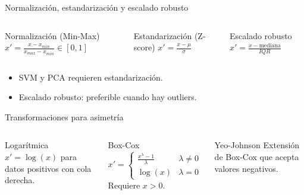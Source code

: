 \documentclass[aspectratio=169, 10pt, xcolor=table]{beamer}
\begin{document}
\begin{frame}{Normalización, estandarización y escalado robusto}
    \begin{columns}[t]
        \begin{block}{Normalización (Min-Max)}
            $x' = \frac{x - x_{min}}{x_{max} - x_{min}} \in [0,1]$
        \end{block}
        \begin{block}{Estandarización (Z-score)}
            $x' = \frac{x - \mu}{\sigma}$
        \end{block}
        \begin{block}{Escalado robusto}
            $x' = \frac{x - \text{mediana}}{IQR}$
        \end{block}
    \end{columns}
    \vspace{0.2cm}
    \begin{itemize}
        \item SVM y PCA requieren estandarización.
        \item Escalado robusto: preferible cuando hay outliers.
    \end{itemize}
\end{frame}

\begin{frame}{Transformaciones para asimetría}
    \begin{columns}[t]
        \begin{block}{Logarítmica}
            $x' = \log(x)$ para datos positivos con cola derecha.
        \end{block}
        \begin{block}{Box-Cox}
            \[
            x' = \begin{cases}
                \frac{x^\lambda - 1}{\lambda} & \lambda \neq 0 \\
                \log(x) & \lambda = 0
            \end{cases}
            \]
            Requiere $x>0$.
        \end{block}
        \begin{block}{Yeo-Johnson}
            Extensión de Box-Cox que acepta valores negativos.
        \end{block}
    \end{columns}
    \vspace{0.2cm}
\end{frame}
\end{document}
